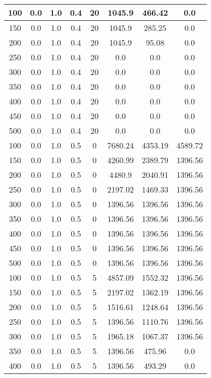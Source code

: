 \documentclass[a4paper, 12pt]{extreport}
\begin{document}
\begin{itemize}
\begin{longtable}{|c|c|c|c|c|c|c|c|}
			100 & 0.0 & 1.0 & 0.4 & 20 & 1045.9 & 466.42 & 0.0 \\\hline
			150 & 0.0 & 1.0 & 0.4 & 20 & 1045.9 & 285.25 & 0.0 \\\hline
			200 & 0.0 & 1.0 & 0.4 & 20 & 1045.9 & 95.08 & 0.0 \\\hline
			250 & 0.0 & 1.0 & 0.4 & 20 & 0.0 & 0.0 & 0.0 \\\hline
			300 & 0.0 & 1.0 & 0.4 & 20 & 0.0 & 0.0 & 0.0 \\\hline
			350 & 0.0 & 1.0 & 0.4 & 20 & 0.0 & 0.0 & 0.0 \\\hline
			400 & 0.0 & 1.0 & 0.4 & 20 & 0.0 & 0.0 & 0.0 \\\hline
			450 & 0.0 & 1.0 & 0.4 & 20 & 0.0 & 0.0 & 0.0 \\\hline
			500 & 0.0 & 1.0 & 0.4 & 20 & 0.0 & 0.0 & 0.0 \\\hline
			100 & 0.0 & 1.0 & 0.5 & 0 & 7680.24 & 4353.19 & 4589.72 \\\hline
			150 & 0.0 & 1.0 & 0.5 & 0 & 4260.99 & 2389.79 & 1396.56 \\\hline
			200 & 0.0 & 1.0 & 0.5 & 0 & 4480.9 & 2040.91 & 1396.56 \\\hline
			250 & 0.0 & 1.0 & 0.5 & 0 & 2197.02 & 1469.33 & 1396.56 \\\hline
			300 & 0.0 & 1.0 & 0.5 & 0 & 1396.56 & 1396.56 & 1396.56 \\\hline
			350 & 0.0 & 1.0 & 0.5 & 0 & 1396.56 & 1396.56 & 1396.56 \\\hline
			400 & 0.0 & 1.0 & 0.5 & 0 & 1396.56 & 1396.56 & 1396.56 \\\hline
			450 & 0.0 & 1.0 & 0.5 & 0 & 1396.56 & 1396.56 & 1396.56 \\\hline
			500 & 0.0 & 1.0 & 0.5 & 0 & 1396.56 & 1396.56 & 1396.56 \\\hline
			100 & 0.0 & 1.0 & 0.5 & 5 & 4857.09 & 1552.32 & 1396.56 \\\hline
			150 & 0.0 & 1.0 & 0.5 & 5 & 2197.02 & 1362.19 & 1396.56 \\\hline
			200 & 0.0 & 1.0 & 0.5 & 5 & 1516.61 & 1248.64 & 1396.56 \\\hline
			250 & 0.0 & 1.0 & 0.5 & 5 & 1396.56 & 1110.76 & 1396.56 \\\hline
			300 & 0.0 & 1.0 & 0.5 & 5 & 1965.18 & 1067.37 & 1396.56 \\\hline
			350 & 0.0 & 1.0 & 0.5 & 5 & 1396.56 & 475.96 & 0.0 \\\hline
			400 & 0.0 & 1.0 & 0.5 & 5 & 1396.56 & 493.29 & 0.0 \\\hline

\end{longtable}
\end{itemize}
\end{document}
